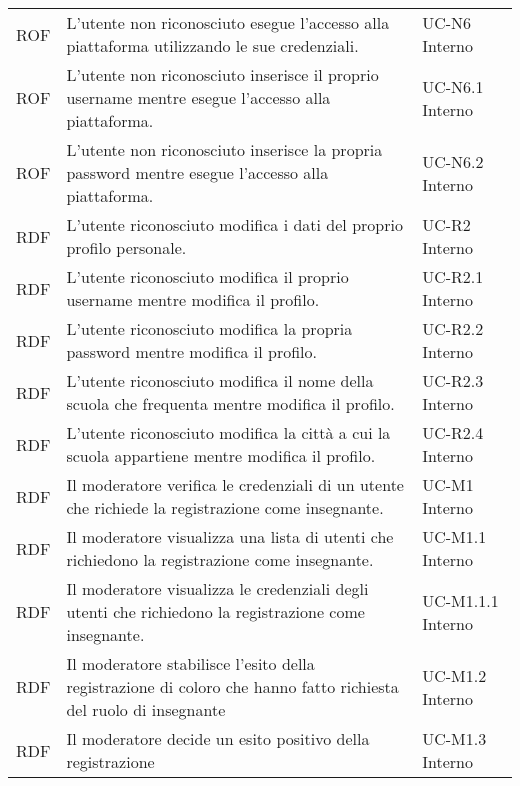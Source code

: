 \begin{tabularx}{\textwidth}{| c | p{10cm} | X |}
		ROF & L'utente non riconosciuto esegue l'accesso alla piattaforma utilizzando le sue credenziali. & UC-N6 \newline Interno\\
		ROF & L'utente non riconosciuto inserisce il proprio username mentre esegue l'accesso alla piattaforma. & UC-N6.1 \newline Interno\\
		ROF & L'utente non riconosciuto inserisce la propria password mentre esegue l'accesso alla piattaforma. & UC-N6.2 \newline Interno\\
		RDF & L'utente riconosciuto modifica i dati del proprio profilo personale. & UC-R2 \newline Interno\\
		RDF & L'utente riconosciuto modifica il proprio username mentre modifica il profilo. & UC-R2.1 \newline Interno\\
		RDF & L'utente riconosciuto modifica la propria password mentre modifica il profilo. & UC-R2.2 \newline Interno\\
		RDF & L'utente riconosciuto modifica il nome della scuola che frequenta mentre modifica il profilo. & UC-R2.3 \newline Interno\\
		RDF & L'utente riconosciuto modifica la città a cui la scuola appartiene mentre modifica il profilo. & UC-R2.4 \newline Interno\\
		RDF & Il moderatore verifica le credenziali di un utente che richiede la registrazione come insegnante. & UC-M1 \newline Interno\\
		RDF & Il moderatore visualizza una lista di utenti che richiedono la registrazione come insegnante. & UC-M1.1 \newline Interno\\
		RDF & Il moderatore visualizza le credenziali degli utenti che richiedono la registrazione come insegnante. & UC-M1.1.1 \newline Interno\\
		RDF & Il moderatore stabilisce l'esito della registrazione di coloro che hanno fatto richiesta del ruolo di insegnante & UC-M1.2 \newline Interno\\
		RDF & Il moderatore decide un esito positivo della registrazione & UC-M1.3 \newline Interno\\

\end{tabularx}
